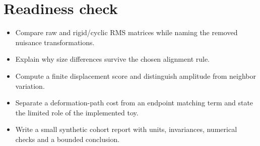 \documentclass[11pt,letterpaper]{article}
\theoremstyle{definition}\newtheorem{definition}{Definition}\newtheorem{example}{Example}
\numberwithin{equation}{section}
\begin{document}
\section*{Readiness check}
\begin{itemize}
\item Compare raw and rigid/cyclic RMS matrices while naming the removed nuisance transformations.
\item Explain why size differences survive the chosen alignment rule.
\item Compute a finite displacement score and distinguish amplitude from neighbor variation.
\item Separate a deformation-path cost from an endpoint matching term and state the limited role of the implemented toy.
\item Write a small synthetic cohort report with units, invariances, numerical checks and a bounded conclusion.
\end{itemize}
\end{document}
